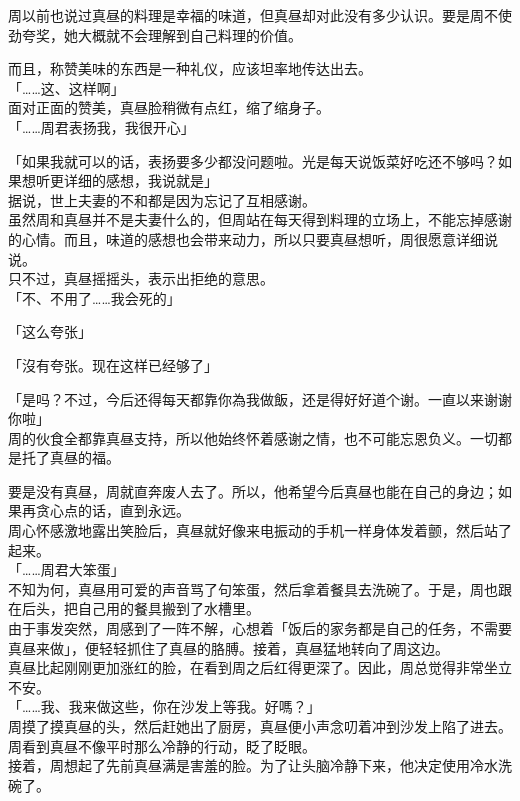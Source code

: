 周以前也说过真昼的料理是幸福的味道，但真昼却对此没有多少认识。要是周不使劲夸奖，她大概就不会理解到自己料理的价值。

而且，称赞美味的东西是一种礼仪，应该坦率地传达出去。\\

「……这、这样啊」\\

面对正面的赞美，真昼脸稍微有点红，缩了缩身子。\\

「……周君表扬我，我很开心」

「如果我就可以的话，表扬要多少都没问题啦。光是每天说饭菜好吃还不够吗？如果想听更详细的感想，我说就是」\\

据说，世上夫妻的不和都是因为忘记了互相感谢。\\

虽然周和真昼并不是夫妻什么的，但周站在每天得到料理的立场上，不能忘掉感谢的心情。而且，味道的感想也会带来动力，所以只要真昼想听，周很愿意详细说说。\\

只不过，真昼摇摇头，表示出拒绝的意思。\\

「不、不用了……我会死的」

「这么夸张」

「沒有夸张。现在这样已经够了」

「是吗？不过，今后还得每天都靠你為我做飯，还是得好好道个谢。一直以来谢谢你啦」\\

周的伙食全都靠真昼支持，所以他始终怀着感谢之情，也不可能忘恩负义。一切都是托了真昼的福。

要是没有真昼，周就直奔废人去了。所以，他希望今后真昼也能在自己的身边；如果再贪心点的话，直到永远。\\

周心怀感激地露出笑脸后，真昼就好像来电振动的手机一样身体发着颤，然后站了起来。\\

「……周君大笨蛋」\\

不知为何，真昼用可爱的声音骂了句笨蛋，然后拿着餐具去洗碗了。于是，周也跟在后头，把自己用的餐具搬到了水槽里。\\

由于事发突然，周感到了一阵不解，心想着「饭后的家务都是自己的任务，不需要真昼来做」，便轻轻抓住了真昼的胳膊。接着，真昼猛地转向了周这边。\\

真昼比起刚刚更加涨红的脸，在看到周之后红得更深了。因此，周总觉得非常坐立不安。\\

「……我、我来做这些，你在沙发上等我。好嗎？」\\

周摸了摸真昼的头，然后赶她出了厨房，真昼便小声念叨着冲到沙发上陷了进去。\\

周看到真昼不像平时那么冷静的行动，眨了眨眼。\\

接着，周想起了先前真昼满是害羞的脸。为了让头脑冷静下来，他决定使用冷水洗碗了。
